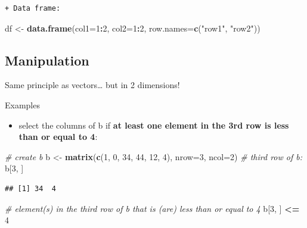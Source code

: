 \documentclass[]{book}
\newenvironment{Shaded}{\begin{snugshade}}{\end{snugshade}}
\newcommand{\CommentTok}[1]{\textcolor[rgb]{0.56,0.35,0.01}{\textit{#1}}}
\newcommand{\DataTypeTok}[1]{\textcolor[rgb]{0.13,0.29,0.53}{#1}}
\newcommand{\DecValTok}[1]{\textcolor[rgb]{0.00,0.00,0.81}{#1}}
\newcommand{\KeywordTok}[1]{\textcolor[rgb]{0.13,0.29,0.53}{\textbf{#1}}}
\newcommand{\NormalTok}[1]{#1}
\newcommand{\OperatorTok}[1]{\textcolor[rgb]{0.81,0.36,0.00}{\textbf{#1}}}
\newcommand{\StringTok}[1]{\textcolor[rgb]{0.31,0.60,0.02}{#1}}
\providecommand{\tightlist}{%
  \setlength{\itemsep}{0pt}\setlength{\parskip}{0pt}}
\begin{document}
\begin{verbatim}
+ Data frame:
\end{verbatim}

\begin{Shaded}
\begin{Highlighting}[]
\NormalTok{df <-}\StringTok{ }\KeywordTok{data.frame}\NormalTok{(}\DataTypeTok{col1=}\DecValTok{1}\OperatorTok{:}\DecValTok{2}\NormalTok{, }\DataTypeTok{col2=}\DecValTok{1}\OperatorTok{:}\DecValTok{2}\NormalTok{, }
    \DataTypeTok{row.names=}\KeywordTok{c}\NormalTok{(}\StringTok{"row1"}\NormalTok{, }\StringTok{"row2"}\NormalTok{))}
\end{Highlighting}
\end{Shaded}

\hypertarget{manipulation}{%
\subsection{Manipulation}\label{manipulation}}

Same principle as vectors\ldots{} but in 2 dimensions!

Examples

\begin{itemize}
\tightlist
\item
  select the columns of b if \textbf{at least one element in the 3rd row is less than or equal to 4}:
\end{itemize}

\begin{Shaded}
\begin{Highlighting}[]
\CommentTok{# create b}
\NormalTok{b <-}\StringTok{ }\KeywordTok{matrix}\NormalTok{(}\KeywordTok{c}\NormalTok{(}\DecValTok{1}\NormalTok{, }\DecValTok{0}\NormalTok{, }\DecValTok{34}\NormalTok{, }\DecValTok{44}\NormalTok{, }\DecValTok{12}\NormalTok{, }\DecValTok{4}\NormalTok{), }
    \DataTypeTok{nrow=}\DecValTok{3}\NormalTok{, }
    \DataTypeTok{ncol=}\DecValTok{2}\NormalTok{)}
\CommentTok{# third row of b:}
\NormalTok{b[}\DecValTok{3}\NormalTok{, ]}
\end{Highlighting}
\end{Shaded}

\begin{verbatim}
## [1] 34  4
\end{verbatim}

\begin{Shaded}
\begin{Highlighting}[]
\CommentTok{# element(s) in the third row of b that is (are) less than or equal to 4}
\NormalTok{b[}\DecValTok{3}\NormalTok{, ] }\OperatorTok{<=}\StringTok{ }\DecValTok{4}
\end{Highlighting}
\end{Shaded}
\end{document}
